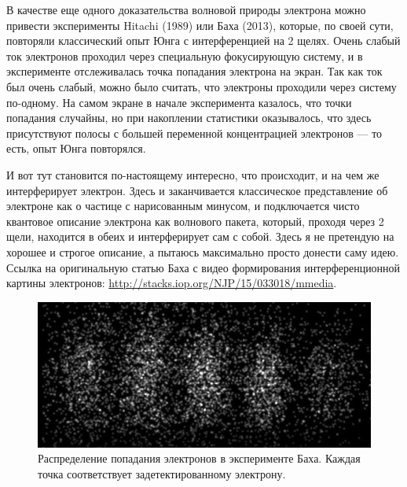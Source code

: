 \documentclass[12pt]{article}
\begin{document}
В качестве еще одного доказательства волновой природы электрона можно привести эксперименты Hitachi (1989) или Баха (2013),  которые, по своей сути, повторяли классический опыт Юнга с интерференцией на 2 щелях. Очень слабый ток электронов проходил через специальную фокусирующую систему, и в эксперименте отслеживалась точка попадания электрона на экран. Так как ток был очень слабый, можно было считать, что электроны проходили через систему по-одному. На самом экране в начале эксперимента казалось, что точки попадания случайны, но при накоплении статистики оказывалось, что здесь присутствуют полосы с большей переменной концентрацией электронов --- то есть, опыт Юнга повторялся. 

И вот тут становится по-настоящему интересно, что происходит, и на чем же интерферирует электрон. Здесь и заканчивается классическое представление об электроне как о частице с нарисованным минусом, и подключается чисто квантовое описание электрона как волнового пакета, который, проходя через 2 щели, находится в обеих и интерферирует сам с собой. Здесь я не претендую на хорошее и строгое описание, а пытаюсь максимально просто донести саму идею. Ссылка на оригинальную статью Баха с видео формирования интерференционной картины электронов: \url{http://stacks.iop.org/NJP/15/033018/mmedia}.
\begin{figure}[h]
    \centering
    \includegraphics[width=\textwidth,height=\textheight,keepaspectratio]{Seminar_03/pics/pic_01.png}
    \caption{Распределение попадания электронов в эксперименте Баха. Каждая точка соответствует задетектированному электрону.}
    \label{fig:sem_03_bach_experiment}
\end{figure}
\end{document}
